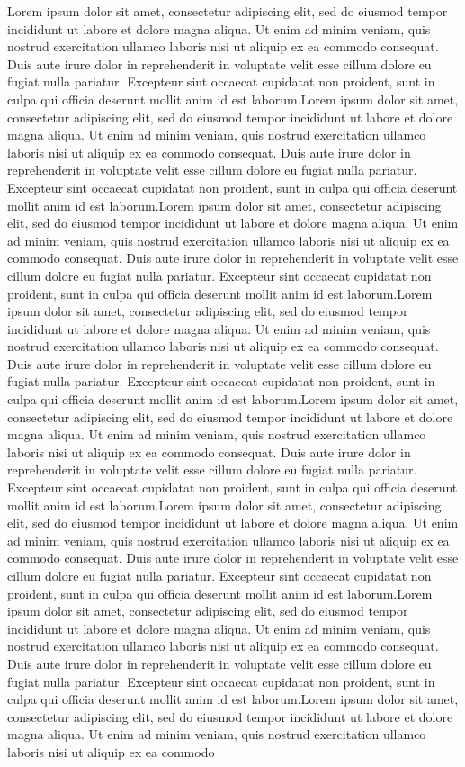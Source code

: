 \documentclass[10pt,journal,compsoc]{IEEEtran}
\begin{document}
Lorem ipsum dolor sit amet, consectetur adipiscing elit, sed do eiusmod tempor incididunt ut labore et dolore magna aliqua. Ut enim ad minim veniam, quis nostrud exercitation ullamco laboris nisi ut aliquip ex ea commodo consequat. Duis aute irure dolor in reprehenderit in voluptate velit esse cillum dolore eu fugiat nulla pariatur. Excepteur sint occaecat cupidatat non proident, sunt in culpa qui officia deserunt mollit anim id est laborum.Lorem ipsum dolor sit amet, consectetur adipiscing elit, sed do eiusmod tempor incididunt ut labore et dolore magna aliqua. Ut enim ad minim veniam, quis nostrud exercitation ullamco laboris nisi ut aliquip ex ea commodo consequat. Duis aute irure dolor in reprehenderit in voluptate velit esse cillum dolore eu fugiat nulla pariatur. Excepteur sint occaecat cupidatat non proident, sunt in culpa qui officia deserunt mollit anim id est laborum.Lorem ipsum dolor sit amet, consectetur adipiscing elit, sed do eiusmod tempor incididunt ut labore et dolore magna aliqua. Ut enim ad minim veniam, quis nostrud exercitation ullamco laboris nisi ut aliquip ex ea commodo consequat. Duis aute irure dolor in reprehenderit in voluptate velit esse cillum dolore eu fugiat nulla pariatur. Excepteur sint occaecat cupidatat non proident, sunt in culpa qui officia deserunt mollit anim id est laborum.Lorem ipsum dolor sit amet, consectetur adipiscing elit, sed do eiusmod tempor incididunt ut labore et dolore magna aliqua. Ut enim ad minim veniam, quis nostrud exercitation ullamco laboris nisi ut aliquip ex ea commodo consequat. Duis aute irure dolor in reprehenderit in voluptate velit esse cillum dolore eu fugiat nulla pariatur. Excepteur sint occaecat cupidatat non proident, sunt in culpa qui officia deserunt mollit anim id est laborum.Lorem ipsum dolor sit amet, consectetur adipiscing elit, sed do eiusmod tempor incididunt ut labore et dolore magna aliqua. Ut enim ad minim veniam, quis nostrud exercitation ullamco laboris nisi ut aliquip ex ea commodo consequat. Duis aute irure dolor in reprehenderit in voluptate velit esse cillum dolore eu fugiat nulla pariatur. Excepteur sint occaecat cupidatat non proident, sunt in culpa qui officia deserunt mollit anim id est laborum.Lorem ipsum dolor sit amet, consectetur adipiscing elit, sed do eiusmod tempor incididunt ut labore et dolore magna aliqua. Ut enim ad minim veniam, quis nostrud exercitation ullamco laboris nisi ut aliquip ex ea commodo consequat. Duis aute irure dolor in reprehenderit in voluptate velit esse cillum dolore eu fugiat nulla pariatur. Excepteur sint occaecat cupidatat non proident, sunt in culpa qui officia deserunt mollit anim id est laborum.Lorem ipsum dolor sit amet, consectetur adipiscing elit, sed do eiusmod tempor incididunt ut labore et dolore magna aliqua. Ut enim ad minim veniam, quis nostrud exercitation ullamco laboris nisi ut aliquip ex ea commodo consequat. Duis aute irure dolor in reprehenderit in voluptate velit esse cillum dolore eu fugiat nulla pariatur. Excepteur sint occaecat cupidatat non proident, sunt in culpa qui officia deserunt mollit anim id est laborum.Lorem ipsum dolor sit amet, consectetur adipiscing elit, sed do eiusmod tempor incididunt ut labore et dolore magna aliqua. Ut enim ad minim veniam, quis nostrud exercitation ullamco laboris nisi ut aliquip ex ea commodo 
\end{document}
